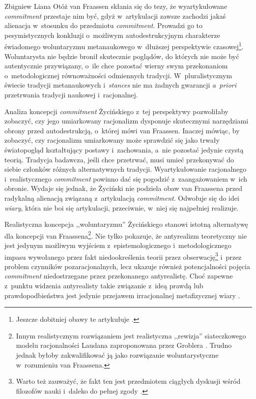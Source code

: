\begin{artplenv}{Zbigniew Liana}
Otóż van Fraassen
\parencite*[][s.~157n]{van_fraassen_stance_2011} %
 skłania się do tezy, że wyartykułowane \textit{commitment} przestaje nim być, gdyż w~artykulacji zawsze zachodzi jakaś alienacja w~stosunku do przedmiotu \textit{commitment}. Prowadzi go to pesymistycznych konkluzji o~możliwym autodestrukcyjnym charakterze świadomego woluntaryzmu metanaukowego w~dłuższej perspektywie czasowej\footnote{Jeszcze dobitniej obawy te artykułuje 
\parencite[][s.~65]{teller_learning_2011}.%
}. Woluntarysta nie będzie bronił skutecznie poglądów, do których nie może być autentycznie przywiązany, o~ile chce pozostać wierny swym przekonaniom o~metodologicznej równoważności odmiennych tradycji. W~pluralistycznym świecie tradycji metanaukowych i~\textit{stances} nie ma żadnych gwarancji \textit{a~priori} przetrwania tradycji naukowej i~racjonalnej.

Analiza koncepcji \textit{commitment} Życińskiego z~tej perspektywy pozwoliłaby zobaczyć, czy jego umiarkowany racjonalizm dysponuje skutecznymi narzędziami obrony przed autodestrukcją, o~której mówi van Fraassen. Inaczej mówiąc, by zobaczyć, czy racjonalizm umiarkowany może sprawdzić się jako trwały światopogląd kształtujący postawy i~zachowania, a~nie pozostać jedynie czystą teorią. Tradycja badawcza, jeśli chce przetrwać, musi umieć przekonywać do siebie członków różnych alternatywnych tradycji. Wyartykułowanie racjonalnego i~realistycznego \textit{commitment} powinno dać się pogodzić z~zaangażowaniem w~ich obronie. Wydaje się jednak, że Życiński nie podziela obaw van Fraassena przed radykalną alienacją związaną z~artykulacją \textit{commitment}. Odwołuje się do idei \textit{wiary}, która nie boi się artykulacji, przeciwnie, w~niej się najpełniej realizuje.

Realistyczna koncepcja ,,woluntaryzmu'' Życińskiego stanowi istotną alternatywę dla koncepcji van Fraassena\footnote{Innym realistycznym rozwiązaniem jest realistyczna ,,rewizja'' siateczkowego modelu racjonalności Laudana zaproponowana przez Groblera
\parencite*[][s.~35nn]{grobler_prawda_1993}. %
 Trudno jednak byłoby zakwalifikować ją jako rozwiązanie woluntarystyczne w~rozumieniu van Fraassena.}. Nie tylko pokazuje, że antyrealizm teoretyczny nie jest jedynym możliwym wyjściem z~epistemologicznego i~metodologicznego impasu wywołanego przez fakt niedookreślenia teorii przez obserwację\footnote{Warto też zauważyć, że fakt ten jest przedmiotem ciągłych dyskusji wśród filozofów nauki i~daleko do pełnej zgody 
\parencite[zob.][]{stanford_underdetermination_2017}.%
} i~przez problem czynników pozaracjonalnych, lecz ukazuje również potencjalności pojęcia \textit{commitment} niedostrzegane przez przekonanego antyrealistę. Choć zapewne z~punktu widzenia antyrealisty takie związanie z~ideą prawdą lub prawdopodbieństwa jest jedynie przejawem irracjonalnej metafizycznej wiary 
\parencite[][s.~41n]{chakravartty_puzzle_2011}.%



\end{artplenv}
